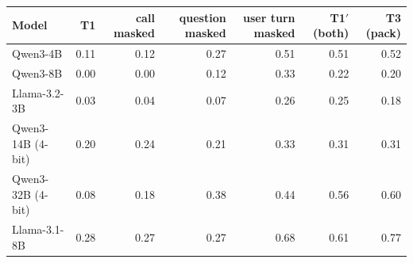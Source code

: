 \begin{tabular}{lrrrrrr}
\toprule
Model & T1 & call masked & question masked & user turn masked & T1$'$ (both) & T3 (pack) \\
\midrule
Qwen3-4B & 0.11 & 0.12 & 0.27 & 0.51 & 0.51 & 0.52 \\
Qwen3-8B & 0.00 & 0.00 & 0.12 & 0.33 & 0.22 & 0.20 \\
Llama-3.2-3B & 0.03 & 0.04 & 0.07 & 0.26 & 0.25 & 0.18 \\
Qwen3-14B (4-bit) & 0.20 & 0.24 & 0.21 & 0.33 & 0.31 & 0.31 \\
Qwen3-32B (4-bit) & 0.08 & 0.18 & 0.38 & 0.44 & 0.56 & 0.60 \\
Llama-3.1-8B & 0.28 & 0.27 & 0.27 & 0.68 & 0.61 & 0.77 \\
\bottomrule
\end{tabular}
